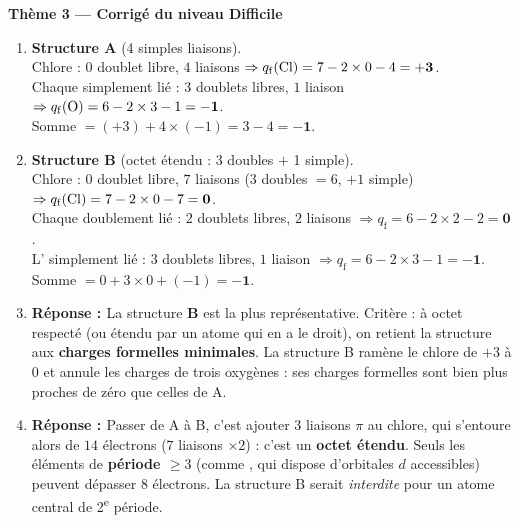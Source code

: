 \documentclass[11pt,a4paper]{article}
\newcommand{\rep}{\textbf{\textcolor{corcol}{Réponse : }}}
\begin{document}
\begin{center}
{\Large\bfseries\color{primarydark}Thème 3 — Corrigé du niveau Difficile}
\end{center}
\medskip

\begin{cor}
\begin{enumerate}[label=\alph*),leftmargin=2em,itemsep=3pt]
  \item \textbf{Structure A} (4 simples liaisons).\\
        Chlore : $0$ doublet libre, $4$ liaisons $\Rightarrow
        q_{\mathrm{f}}(\ce{Cl}) = 7 - 2\times 0 - 4 = \mathbf{+3}$.\\
        Chaque  simplement lié : $3$ doublets libres, $1$ liaison $\Rightarrow
        q_{\mathrm{f}}(\ce{O}) = 6 - 2\times 3 - 1 = \mathbf{-1}$.\\
        Somme $= (+3) + 4\times(-1) = 3 - 4 = \mathbf{-1}$. \checkmark
  \item \textbf{Structure B} (octet étendu : 3 doubles $+$ 1 simple).\\
        Chlore : $0$ doublet libre, $7$ liaisons (3 doubles $=6$, $+1$ simple) $\Rightarrow
        q_{\mathrm{f}}(\ce{Cl}) = 7 - 2\times 0 - 7 = \mathbf{0}$.\\
        Chaque  doublement lié : $2$ doublets libres, $2$ liaisons $\Rightarrow
        q_{\mathrm{f}} = 6 - 2\times 2 - 2 = \mathbf{0}$.\\
        L' simplement lié : $3$ doublets libres, $1$ liaison $\Rightarrow
        q_{\mathrm{f}} = 6 - 2\times 3 - 1 = \mathbf{-1}$.\\
        Somme $= 0 + 3\times 0 + (-1) = \mathbf{-1}$. \checkmark
  \item \rep La structure \textbf{B} est la plus représentative. Critère : à octet respecté (ou
        étendu par un atome qui en a le droit), on retient la structure aux \textbf{charges
        formelles minimales}. La structure B ramène le chlore de $+3$ à $0$ et annule les charges de
        trois oxygènes : ses charges formelles sont bien plus proches de zéro que celles de A.
  \item \rep Passer de A à B, c'est ajouter $3$ liaisons $\pi$ au chlore, qui s'entoure alors de
        $14$ électrons ($7$ liaisons $\times 2$) : c'est un \textbf{octet étendu}. Seuls les
        éléments de \textbf{période $\geq 3$} (comme , qui dispose d'orbitales $d$
        accessibles) peuvent dépasser $8$ électrons. La structure B serait \emph{interdite} pour un
        atome central de 2\textsuperscript{e} période.
\end{enumerate}
\end{cor}
\end{document}
